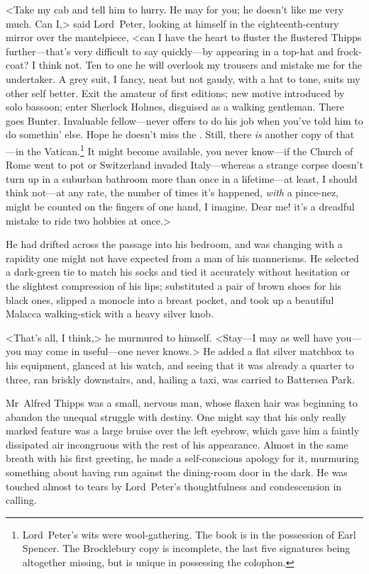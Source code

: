 <Take my cab and tell him to hurry. He may for you; he doesn't like me very much. Can I\@,> said Lord~Peter, looking at himself in the eighteenth-century mirror over the mantelpiece, <can I have the heart to fluster the flustered Thipps further—that's very difficult to say quickly—by appearing in a top-hat and frock-coat? I think not. Ten to one he will overlook my trousers and mistake me for the undertaker. A grey suit, I fancy, neat but not gaudy, with a hat to tone, suits my other self better. Exit the amateur of first editions; new motive introduced by solo bassoon; enter Sherlock Holmes, disguised as a walking gentleman. There goes Bunter. Invaluable fellow—never offers to do his job when you've told him to do somethin' else. Hope he doesn't miss the . Still, there \emph{is} another copy of that—in the Vatican.\footnote{Lord~Peter's wits were wool-gathering. The book is in the possession of Earl Spencer. The Brocklebury copy is incomplete, the last five signatures being altogether missing, but is unique in possessing the colophon.} It might become available, you never know—if the Church of Rome went to pot or Switzerland invaded Italy—whereas a strange corpse doesn't turn up in a suburban bathroom more than once in a lifetime—at least, I should think not—at any rate, the number of times it's happened, \emph{with} a pince-nez, might be counted on the fingers of one hand, I imagine. Dear me! it's a dreadful mistake to ride two hobbies at once.>

He had drifted across the passage into his bedroom, and was changing with a rapidity one might not have expected from a man of his mannerisms. He selected a dark-green tie to match his socks and tied it accurately without hesitation or the slightest compression of his lips; substituted a pair of brown shoes for his black ones, slipped a monocle into a breast pocket, and took up a beautiful Malacca walking-stick with a heavy silver knob.

<That's all, I think,> he murmured to himself. <Stay—I may as well have you—you may come in useful—one never knows.> He added a flat silver matchbox to his equipment, glanced at his watch, and seeing that it was already a quarter to three, ran briskly downstairs, and, hailing a taxi, was carried to Battersea Park.

Mr~Alfred Thipps was a small, nervous man, whose flaxen hair was beginning to abandon the unequal struggle with destiny. One might say that his only really marked feature was a large bruise over the left eyebrow, which gave him a faintly dissipated air incongruous with the rest of his appearance. Almost in the same breath with his first greeting, he made a self-conscious apology for it, murmuring something about having run against the dining-room door in the dark. He was touched almost to tears by Lord~Peter's thoughtfulness and condescension in calling.

